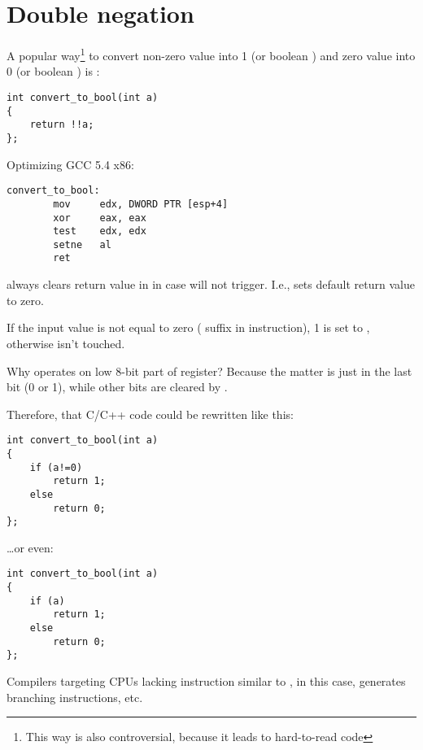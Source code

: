 \section{Double negation}

A popular way\footnote{This way is also controversial, because it leads to hard-to-read code} to convert non-zero value into 1 (or boolean ) and zero value into 0 (or boolean ) is :

\begin{lstlisting}[style=customc]
int convert_to_bool(int a)
{
	return !!a;
};
\end{lstlisting}

Optimizing GCC 5.4 x86:

\begin{lstlisting}[style=customasmx86]
convert_to_bool:
        mov     edx, DWORD PTR [esp+4]
        xor     eax, eax
        test    edx, edx
        setne   al
        ret
\end{lstlisting}

 always clears return value in \EAX in case  will not trigger.
I.e.,  sets default return value to zero.

If the input value is not equal to zero ( suffix in  instruction),
1 is set to \AL, otherwise \AL isn't touched.

Why  operates on low 8-bit part of \EAX register?
Because the matter is just in the last bit (0 or 1), while other bits are cleared by .

Therefore, that C/C++ code could be rewritten like this:

\begin{lstlisting}[style=customc]
int convert_to_bool(int a)
{
	if (a!=0)
		return 1;
	else
		return 0;
};
\end{lstlisting}

\dots or even:

\begin{lstlisting}[style=customc]
int convert_to_bool(int a)
{
	if (a)
		return 1;
	else
		return 0;
};
\end{lstlisting}

Compilers targeting \ac{CPU}s lacking instruction similar to , in this case,
generates branching instructions, etc.

